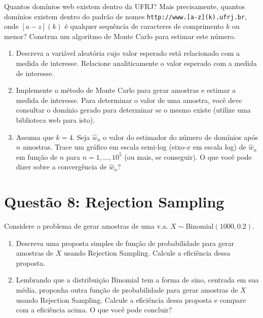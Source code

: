 \documentclass[12 pt]{article}
\begin{document}
Quantos domínios web existem dentro da UFRJ? Mais precisamente, quantos domínios existem dentro do padrão de nomes \texttt{http://www.[a-z](k).ufrj.br}, onde $[a-z](k)$ é qualquer sequência de caracteres de comprimento $k$ ou menor? Construa um algoritmo de Monte Carlo para estimar este número.

\begin{enumerate}
    \item Descreva a variável aleatória cujo valor esperado está relacionado com a medida de interesse. Relacione analiticamente o valor esperado com a medida de interesse.
    \begin{tcolorbox}[colframe=black, title=Resposta:]

    \end{tcolorbox}
    \item Implemente o método de Monte Carlo para gerar amostras e estimar a medida de interesse. Para determinar o valor de uma amostra, você deve consultar o domínio gerado para determinar se o mesmo existe (utilize uma biblioteca web para isto).
    \begin{tcolorbox}[colframe=black, title=Resposta:]

    \end{tcolorbox}
    \item Assuma que $k = 4$. Seja $\hat{w}_n$ o valor do estimador do número de domínios após $n$ amostras. Trace um gráfico em escala semi-log (eixo-$x$ em escala log) de $\hat{w}_n$ em função de $n$ para $n = 1, \dots, 10^5$ (ou mais, se conseguir). O que você pode dizer sobre a convergência de $\hat{w}_n$?
    \begin{tcolorbox}[colframe=black, title=Resposta:]

    \end{tcolorbox}
\end{enumerate}

\section*{Questão 8: Rejection Sampling}

Considere o problema de gerar amostras de uma v.a. $X \sim \text{Binomial}(1000, 0.2)$.

\begin{enumerate}
    \item Descreva uma proposta simples de função de probabilidade para gerar amostras de $X$ usando Rejection Sampling. Calcule a eficiência dessa proposta.
    \begin{tcolorbox}[colframe=black, title=Resposta:]

    \end{tcolorbox}
    \item Lembrando que a distribuição Binomial tem a forma de sino, centrada em sua média, proponha outra função de probabilidade para gerar amostras de $X$ usando Rejection Sampling. Calcule a eficiência dessa proposta e compare com a eficiência acima. O que você pode concluir?
    \begin{tcolorbox}[colframe=black, title=Resposta:]

    \end{tcolorbox}
\end{enumerate}
\end{document}
